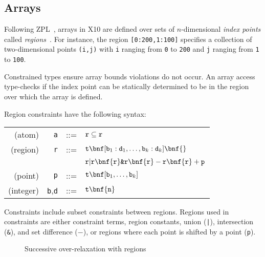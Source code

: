 % 

\subsection{Arrays}

Following ZPL~\cite{ZPL}, arrays in X10
are defined over sets of $n$-dimensional {\em index points}
called {\em regions}~\cite{gps06-arrays}.
For instance, the region {\tt [0:200,1:100]} specifies a
collection of two-dimensional points {\tt (i,j)} with {\tt i}
ranging from {\tt 0} to {\tt 200} and {\tt j} ranging from
{\tt 1} to {\tt 100}.

Constrained types ensure array bounds
violations do not occur.
An array access type-checks if the index point can be statically
determined to be in the region over which the array is defined.

Region constraints have the following syntax:

\begin{tabular}{rrcl}
  (atom)   &{\tt a} &::=& ${\tt r} \subseteq {\tt r}$ \\
  (region) &{\tt r} &::=& ${\tt t} \bnf [{\tt b}_1:{\tt
  d}_1,\ldots,{\tt b}_k:{\tt d}_k] \bnf {}$  \\
           &        && ${\tt r} | {\tt r} \bnf {\tt r} \mbox{\tt \&} {\tt r} \bnf {\tt r} - {\tt r} \bnf {\tt r} + {\tt p}$ \\
  (point)  &{\tt p} &::=& ${\tt t} \bnf [{\tt b}_1,\ldots,{\tt b}_k]$ \\
(integer)&{\tt b},{\tt d} &::=& ${\tt t} \bnf {\tt n}$ \\
\end{tabular}

Constraints include subset constraints between regions.
Regions used in constraints are either constraint terms,
region constants, union ({\tt |}), intersection ({\tt \&}), and
set difference ($-$), or regions where each point is
shifted by a point ({\tt p}).


\begin{figure*}

\caption{Successive over-relaxation with regions}
\label{fig:sor}
\end{figure*}

